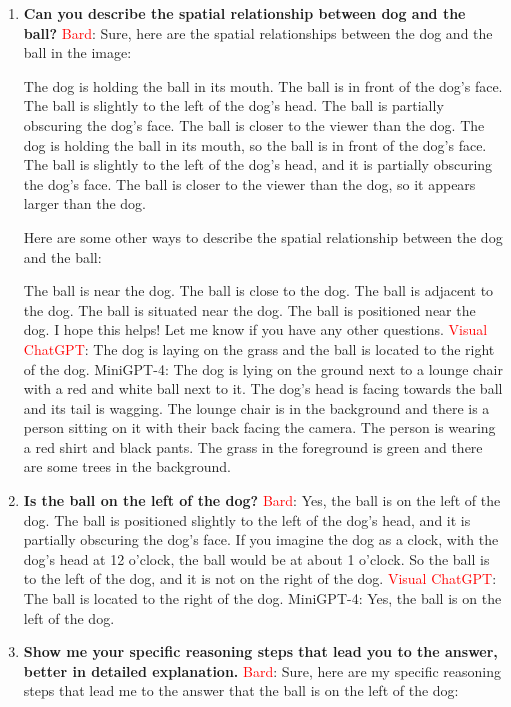     \begin{enumerate}
        \item \textbf{Can you describe the spatial relationship between dog and the ball?}
        \subitem \textcolor{Red}{Bard}: 
        Sure, here are the spatial relationships between the dog and the ball in the image:
        
        The dog is holding the ball in its mouth.
        The ball is in front of the dog's face.
        The ball is slightly to the left of the dog's head.
        The ball is partially obscuring the dog's face.
        The ball is closer to the viewer than the dog.
        The dog is holding the ball in its mouth, so the ball is in front of the dog's face. The ball is slightly to the left of the dog's head, and it is partially obscuring the dog's face. The ball is closer to the viewer than the dog, so it appears larger than the dog.
        
        Here are some other ways to describe the spatial relationship between the dog and the ball:
        
        The ball is near the dog.
        The ball is close to the dog.
        The ball is adjacent to the dog.
        The ball is situated near the dog.
        The ball is positioned near the dog.
        I hope this helps! Let me know if you have any other questions.
        \subitem \textcolor{red}{Visual ChatGPT}: The dog is laying on the grass and the ball is located to the right of the dog.
        \subitem MiniGPT-4: The dog is lying on the ground next to a lounge chair with a red and white ball next to it. The dog’s head is facing towards the ball and its tail is wagging. The lounge chair is in the background and there is a person sitting on it with their back facing the camera. The person is wearing a red shirt and black pants. The grass in the foreground is green and there are some trees in the background.
        \item \textbf{Is the ball on the left of the dog?}
        \subitem \textcolor{Red}{Bard}: 
        Yes, the ball is on the left of the dog. The ball is positioned slightly to the left of the dog's head, and it is partially obscuring the dog's face. If you imagine the dog as a clock, with the dog's head at 12 o'clock, the ball would be at about 1 o'clock. So the ball is to the left of the dog, and it is not on the right of the dog.
        \subitem \textcolor{red}{Visual ChatGPT}: The ball is located to the right of the dog.
        \subitem MiniGPT-4: Yes, the ball is on the left of the dog.
        \item \textbf{Show me your specific reasoning steps that lead you to the answer, better in detailed explanation.}
        \subitem \textcolor{Red}{Bard}: 
        Sure, here are my specific reasoning steps that lead me to the answer that the ball is on the left of the dog:
        

\end{enumerate}
